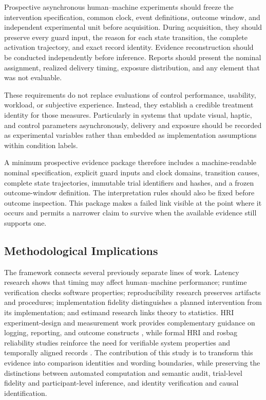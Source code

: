 \documentclass[journal]{IEEEtran}
\begin{document}
Prospective asynchronous human--machine experiments should freeze the
intervention specification, common clock, event definitions, outcome window,
and independent experimental unit before acquisition. During acquisition,
they should preserve every guard input, the reason for each state transition,
the complete activation trajectory, and exact record identity. Evidence
reconstruction should be conducted independently before inference. Reports
should present the nominal assignment, realized delivery timing, exposure
distribution, and any element that was not evaluable.

These requirements do not replace evaluations of control performance,
usability, workload, or subjective experience. Instead, they establish a
credible treatment identity for those measures. Particularly in systems that
update visual, haptic, and control parameters asynchronously, delivery and
exposure should be recorded as experimental variables rather than embedded as
implementation assumptions within condition labels.

A minimum prospective evidence package therefore includes a machine-readable
nominal specification, explicit guard inputs and clock domains, transition
causes, complete state trajectories, immutable trial identifiers and hashes,
and a frozen outcome-window definition. The interpretation rules should also
be fixed before outcome inspection. This package makes a failed link visible
at the point where it occurs and permits a narrower claim to survive when the
available evidence still supports one.

\subsection{Methodological Implications}

The framework connects several previously separate lines of work. Latency
research shows that timing may affect human--machine performance; runtime
verification checks software properties; reproducibility research preserves
artifacts and procedures; implementation fidelity distinguishes a planned
intervention from its implementation; and estimand research links theory to
statistics. HRI experiment-design and measurement work provides complementary
guidance on logging, reporting, and outcome constructs
\cite{hoffmanZhao2020,steinfeld2006,hoffman2019}, while formal HRI and rosbag
reliability studies reinforce the need for verifiable system properties and
temporally aligned records \cite{kressGazit2021,vigni2024}. The contribution
of this study is to transform this evidence into comparison identities and
wording boundaries, while preserving the
distinctions between automated computation and semantic audit, trial-level
fidelity and participant-level inference, and identity verification and causal
identification.
\end{document}
